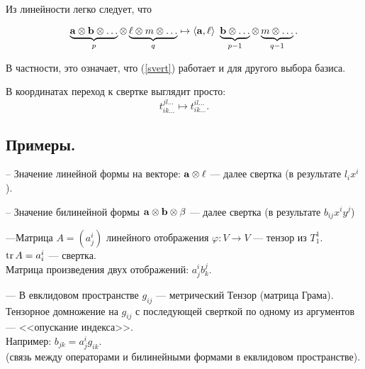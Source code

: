 Из линейности легко следует, что 

$$\underbrace{ \mathbf{a} \otimes \mathbf{b} \otimes \ldots }_p \otimes 
\underbrace{\ell \otimes m \otimes \ldots }_q
\mapsto \langle \mathbf{a}, \ell \rangle \,\,
\underbrace{\mathbf{b} \otimes \ldots }_{p-1}\otimes \underbrace{m \otimes \ldots}_{q-1}.$$

В частности, это означает, что (\ref{svert}) работает и для
другого выбора базиса. 

В координатах переход к свертке выглядит просто: 
$$t_{ik\ldots }^{jl\ldots } \mapsto t_{ik\ldots }^{il\ldots }.$$


\subsection{Примеры.}


-- Значение  линейной формы на векторе: 
$\mathbf{a} \otimes \ell$ --- далее свертка (в результате $l_{i} x^i $).

\otstup

-- Значение  билинейной формы
$\mathbf{a} \otimes \mathbf{b} \otimes \beta  $ --- далее свертка (в результате $b_{ij} x^i y^j$)

\otstup

---Матрица $A=(a^i_j)$ линейного отображения $\varphi : V\to V$ --- 
тензор из $T^1_1$.\\
$\mathop{\rm tr}\nolimits A  = a^i_i$ --- свертка.\\
Матрица произведения двух отображений:
$a^i_j b^j_k$.

\otstup


--- В евклидовом пространстве $g_{ij}$ --- метрический Тензор (матрица Грама).\\
Тензорное домножение на $g_{ij}$ с последующей сверткой по одному из аргументов --- <<опускание индекса>>.\\
Например: $b_{jk} = a^i_j g_{ik}$.\\
(связь между операторами и билинейными формами в еквлидовом пространстве).

